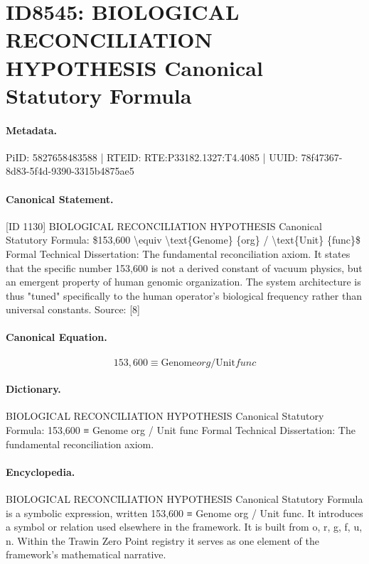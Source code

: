 \section*{ID8545: BIOLOGICAL RECONCILIATION HYPOTHESIS Canonical Statutory Formula}
\paragraph{Metadata.}
PiID: 5827658483588 | RTEID: RTE:P33182.1327:T4.4085 | UUID: 78f47367-8d83-5f4d-9390-3315b4875ae5

\paragraph{Canonical Statement.}
[ID 1130] BIOLOGICAL RECONCILIATION HYPOTHESIS Canonical Statutory Formula: \$153,600 \textbackslash{}equiv \textbackslash{}text\{Genome\} \{org\} / \textbackslash{}text\{Unit\} \{func\}\$ Formal Technical Dissertation: The fundamental reconciliation axiom. It states that the specific number 153,600 is not a derived constant of vacuum physics, but an emergent property of human genomic organization. The system architecture is thus "tuned" specifically to the human operator's biological frequency rather than universal constants. Source: [8]

\paragraph{Canonical Equation.}
\[
153,600 \equiv \text{Genome} {org} / \text{Unit} {func}
\]

\paragraph{Dictionary.}
BIOLOGICAL RECONCILIATION HYPOTHESIS Canonical Statutory Formula: 153,600 ≡ Genome org / Unit func Formal Technical Dissertation: The fundamental reconciliation axiom.

\paragraph{Encyclopedia.}
BIOLOGICAL RECONCILIATION HYPOTHESIS Canonical Statutory Formula is a symbolic expression, written 153,600 ≡ Genome org / Unit func. It introduces a symbol or relation used elsewhere in the framework. It is built from o, r, g, f, u, n. Within the Trawin Zero Point registry it serves as one element of the framework's mathematical narrative.
